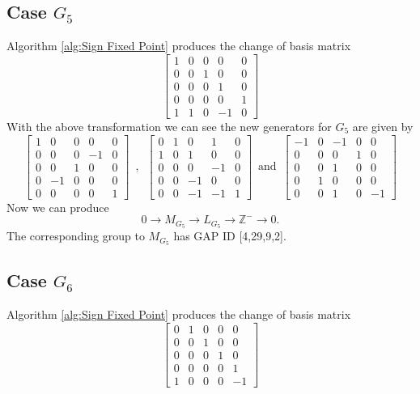 \documentclass{article}
\theoremstyle{plain}
\theoremstyle{definition}
\newcommand{\Z}{\ensuremath{\mathbb{Z}}}
\newcommand{\tand}{\ensuremath{\,\,\, \text{and} \,\,\,}}
\newcommand{\exactseqs}[1]{\ensuremath{0 \longrightarrow M_{#1} \longrightarrow L_{#1} \longrightarrow \Z^{-} \longrightarrow 0}}
\begin{document}
\subsection{Case $G_5$}
Algorithm \ref{alg:Sign Fixed Point} produces the change of basis matrix 
$$
 \left[ \begin {array}{ccccc} 1&0&0&0&0\\ 0&0&1&0&0
\\ 0&0&0&1&0\\ 0&0&0&0&1
\\ 1&1&0&-1&0\end {array} \right]
$$
With the above transformation we can see the new generators for $G_5$ are given by 
$$
\left[ \begin {array}{cccc|c} 1&0&0&0&0\\0&0&0&-1&0
\\0&0&1&0&0\\0&-1&0&0&0
\\ \hline 0&0&0&0&1\end {array} \right] 
\,\,\, , \,\,\,
 \left[ \begin {array}{cccc|c} 0&1&0&1&0\\1&0&1&0&0
\\0&0&0&-1&0\\0&0&-1&0&0
\\ \hline 0&0&-1&-1&1\end {array} \right] 
\tand
 \left[ \begin {array}{cccc|c} -1&0&-1&0&0\\0&0&0&1&0
\\0&0&1&0&0\\0&1&0&0&0
\\ \hline 0&0&1&0&-1\end {array} \right] 
$$
Now we can produce
$$
\exactseqs{G_5}
.$$
The corresponding group to $M_{G_5}$ has GAP ID [4,29,9,2]. 
\subsection{Case $G_6$}
Algorithm \ref{alg:Sign Fixed Point} produces the change of basis matrix 
$$
 \left[ \begin {array}{ccccc} 0&1&0&0&0\\ 0&0&1&0&0
\\ 0&0&0&1&0\\ 0&0&0&0&1
\\ 1&0&0&0&-1\end {array} \right]
$$
\end{document}
